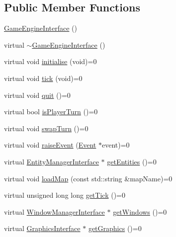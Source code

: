 \subsection*{Public Member Functions}
\begin{DoxyCompactItemize}
\item 
\hyperlink{classGameEngineInterface_acfe04e158f13c49fa34201d965856f98}{Game\-Engine\-Interface} ()
\item 
virtual \hyperlink{classGameEngineInterface_a3f62425d6da8aa68ee3698dc3034aa89}{$\sim$\-Game\-Engine\-Interface} ()
\item 
virtual void \hyperlink{classGameEngineInterface_a25d6afec02af24ef82961dc32deee5d3}{initialise} (void)=0
\item 
virtual void \hyperlink{classGameEngineInterface_a018db9a3868f8ef3c5b864bae5047a42}{tick} (void)=0
\item 
virtual void \hyperlink{classGameEngineInterface_a835c89ce5e9dac696f2b776e8b3fd6db}{quit} ()=0
\item 
virtual bool \hyperlink{classGameEngineInterface_a1f8c96fabf08e5f978859611a68eab03}{is\-Player\-Turn} ()=0
\item 
virtual void \hyperlink{classGameEngineInterface_aff6fe7a94c1421f26642cf0485c2d4ce}{swap\-Turn} ()=0
\item 
virtual void \hyperlink{classGameEngineInterface_a4826bce0dc77598e2ca0869ce2462db7}{raise\-Event} (\hyperlink{classEvent}{Event} $\ast$event)=0
\item 
virtual \hyperlink{classEntityManagerInterface}{Entity\-Manager\-Interface} $\ast$ \hyperlink{classGameEngineInterface_ac7b9bb5c99fd8fec773a64d492d1869e}{get\-Entities} ()=0
\item 
virtual void \hyperlink{classGameEngineInterface_aa7dc3bc46f821ac6f545f191272be2b3}{load\-Map} (const std\-::string \&map\-Name)=0
\item 
virtual unsigned long long \hyperlink{classGameEngineInterface_adcdcb9774de6e2df6ef0d0c45f3216d7}{get\-Tick} ()=0
\item 
virtual \hyperlink{classWindowManagerInterface}{Window\-Manager\-Interface} $\ast$ \hyperlink{classGameEngineInterface_a2c99c33358dd5c5a34e046887440ced1}{get\-Windows} ()=0
\item 
virtual \hyperlink{classGraphicsInterface}{Graphics\-Interface} $\ast$ \hyperlink{classGameEngineInterface_ad1f1c9ed5b4e809c1133719af535db2d}{get\-Graphics} ()=0
\end{DoxyCompactItemize}



